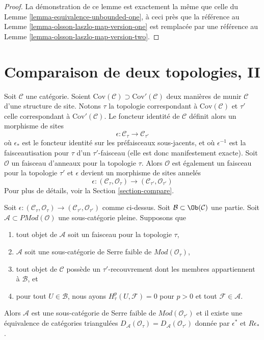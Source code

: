 \begin{proof}
La démonstration de ce lemme est exactement la même que celle du Lemme
\ref{lemma-equivalence-unbounded-one}, à ceci près que la référence au
Lemme \ref{lemma-olsson-laszlo-map-version-one} est remplacée par une
référence au Lemme \ref{lemma-olsson-laszlo-map-version-two}.
\end{proof}








\section{Comparaison de deux topologies, II}
\label{section-compare-II}

\noindent
Soit $\mathcal{C}$ une catégorie. Soient
$\text{Cov}(\mathcal{C}) \supset \text{Cov}'(\mathcal{C})$
deux manières de munir $\mathcal{C}$ d'une structure de site. Notons
$\tau$ la topologie correspondant à $\text{Cov}(\mathcal{C})$ et $\tau'$
celle correspondant à $\text{Cov}'(\mathcal{C})$. Le foncteur identité de
$\mathcal{C}$ définit alors un morphisme de sites
$$
\epsilon : \mathcal{C}_\tau \longrightarrow \mathcal{C}_{\tau'}
$$
où $\epsilon_*$ est le foncteur identité sur les préfaisceaux sous-jacents,
et où $\epsilon^{-1}$ est la faisceautisation pour $\tau$ d'un
$\tau'$-faisceau (elle est donc manifestement exacte). Soit
$\mathcal{O}$ un faisceau d'anneaux pour la topologie $\tau$. Alors
$\mathcal{O}$ est également un faisceau pour la topologie $\tau'$ et
$\epsilon$ devient un morphisme de sites annelés
$$
\epsilon :
(\mathcal{C}_\tau, \mathcal{O}_\tau)
\longrightarrow
(\mathcal{C}_{\tau'}, \mathcal{O}_{\tau'})
$$
Pour plus de détails, voir la Section \ref{section-compare}.

\begin{lemma}
\label{lemma-compare-topologies-derived-adequate-modules}
Soit $\epsilon : (\mathcal{C}_\tau, \mathcal{O}_\tau) \to
(\mathcal{C}_{\tau'}, \mathcal{O}_{\tau'})$ comme ci-dessus. Soit
$\mathcal{B} \subset \Ob(\mathcal{C})$ une partie. Soit
$\mathcal{A} \subset \textit{PMod}(\mathcal{O})$ une sous-catégorie
pleine. Supposons que
\begin{enumerate}
\item tout objet de $\mathcal{A}$ soit un faisceau pour la topologie $\tau$,
\item $\mathcal{A}$ soit une sous-catégorie de Serre faible de
$\textit{Mod}(\mathcal{O}_\tau)$,
\item tout objet de $\mathcal{C}$ possède un $\tau'$-recouvrement dont les
membres appartiennent à $\mathcal{B}$, et
\item pour tout $U \in \mathcal{B}$, nous ayons
$H^p_\tau(U, \mathcal{F}) = 0$ pour $p > 0$ et tout
$\mathcal{F} \in \mathcal{A}$.
\end{enumerate}
Alors $\mathcal{A}$ est une sous-catégorie de Serre faible de
$\textit{Mod}(\mathcal{O}_{\tau'})$ et il existe une équivalence de
catégories triangulées
$D_\mathcal{A}(\mathcal{O}_\tau) = D_\mathcal{A}(\mathcal{O}_{\tau'})$
donnée par $\epsilon^*$ et $R\epsilon_*$.
\end{lemma}


